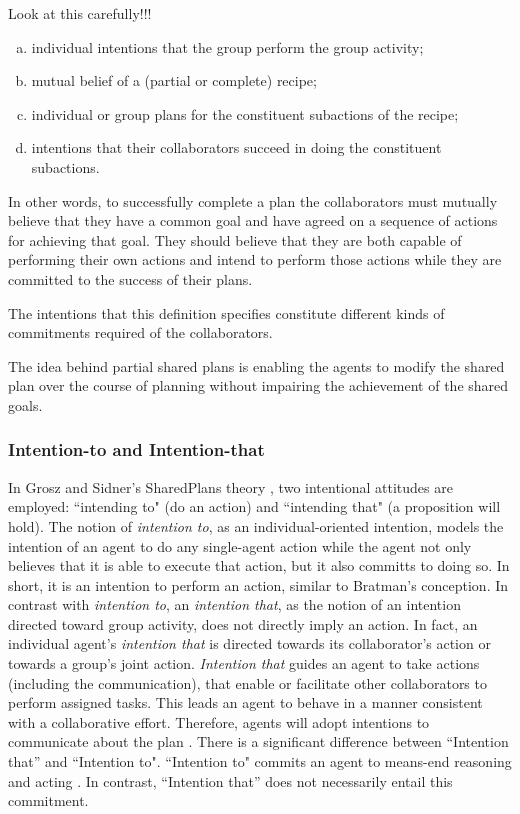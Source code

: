 \documentclass[11pt]{article}
\begin{document}
Look at this carefully!!!

\begin{enumerate}[a)]
  \item individual intentions that the group perform the group activity;
  \item mutual belief of a (partial or complete) recipe;
  \item individual or group plans for the constituent subactions of the recipe;
  \item intentions that their collaborators succeed in doing the constituent
  subactions.
\end{enumerate}
 
In other words, to successfully complete a plan the collaborators must mutually
believe that they have a common goal and have agreed on a sequence of actions
for achieving that goal. They should believe that they are both capable of
performing their own actions and intend to perform those actions while they are
committed to the success of their plans.

The intentions that this definition specifies constitute different kinds of
commitments required of the collaborators. 

The idea behind partial shared plans is enabling the agents to modify the shared
plan over the course of planning without impairing the achievement of the shared
goals.

\subsubsection{Intention-to and Intention-that}

In Grosz and Sidner's SharedPlans theory \cite{grosz:plans-discourse}, two
intentional attitudes are employed: ``intending to" (do an action) and
``intending that" (a proposition will hold). The notion of \textit{intention
to}, as an individual-oriented intention, models the intention of an agent to do
any single-agent action while the agent not only believes that it is able to
execute that action, but it also committs to doing so. In short, it is an
intention to perform an action, similar to Bratman’s conception. In contrast
with \textit{intention to}, an \textit{intention that}, as the notion of an
intention directed toward group activity, does not directly imply an action. In
fact, an individual agent's \textit{intention that} is directed towards its
collaborator's action or towards a group's joint action. \textit{Intention that}
guides an agent to take actions (including the communication), that enable or
facilitate other collaborators to perform assigned tasks. This leads an agent to
behave in a manner consistent with a collaborative effort. Therefore, agents
will adopt intentions to communicate about the plan \cite{grosz:collaboration}.
There is a significant difference between ``Intention that'' and ``Intention
to". ``Intention to" commits an agent to means-end reasoning and acting
\cite{bratman:intentions-plans}. In contrast, ``Intention that'' does not
necessarily entail this commitment.
\end{document}
